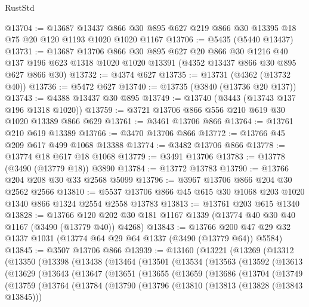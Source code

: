 \begin{lexlean}{RustStd}
\begin{coremodule}
{\begin{coremodule}
{{{{{{{{{{{{{{{{{{{{{{{{{{@13704 := @13687
    @13437
    @866
    @30
    @895
    @627
    @219
    @866
    @30
    @13395
    @18
    @75
    @20
    @120
    @1193
    @1020
    @1020
    @1167
@13706 := @5435 (@5440 @13437)
@13731 := @13687
    @13706
    @866
    @30
    @895
    @627
    @20
    @866
    @30
    @1216
    @40
    @137
    @196
    @623
    @1318
    @1020
    @1020
    @13391
    (@4352 @13437 @866 @30 @895 @627 @866 @30)
@13732 := @4374 @627
@13735 := @13731 (@4362 (@13732 @40))
@13736 := @5472 @627
@13740 := @13735 (@3840 (@13736 @20 @137))
@13743 := @4388 @13437 @30 @895
@13749 := @13740 (@3443 (@13743 @137 @196 @1318 @1020))
@13759 := @3721 @13706 @866 @556 @210 @619 @30 @1020 @13389 @866 @629
@13761 := @3461 @13706 @866
@13764 := @13761 @210 @619 @13389
@13766 := @3470 @13706 @866
@13772 := @13766 @45 @209 @617 @499 @1068 @13388
@13774 := @3482 @13706 @866
@13778 := @13774 @18 @617 @18 @1068
@13779 := @3491 @13706
@13783 := @13778 (@3490 (@13779 @18)) @3890
@13784 := @13772 @13783
@13790 := @13766 @204 @208 @30 @33 @2568 @5099
@13796 := @3967 @13706 @866 @204 @30 @2562 @2566
@13810 := @5537 @13706 @866 @45 @615 @30 @1068 @203 @1020 @1340 @866 @1324 @2554 @2558 @13783
@13813 := @13761 @203 @615 @1340
@13828 := @13766
    @120
    @202
    @30
    @181
    @1167
    @1339
    (@13774 @40 @30 @40 @1167 (@3490 (@13779 @40)) @4268)
@13843 := @13766 @200 @47 @29 @32 @1337 @1031 (@13774 @64 @29 @64 @1337 (@3490 (@13779 @64)) @5584)
@13845 := @3507 @13706 @866
@13939 := @13160
    (@13221
      (@13269
        (@13312
          (@13350
            (@13398
              (@13438
                (@13464
                  (@13501
                    (@13534
                      (@13563
                        (@13592
                          (@13613
                            (@13629
                              (@13643
                                (@13647
                                  (@13651
                                    (@13655
                                      (@13659
                                        (@13686
                                          (@13704
                                            (@13749
                                              (@13759
                                                (@13764
                                                  (@13784
                                                    (@13790
                                                      (@13796
                                                        (@13810
                                                          (@13813 (@13828 (@13843 @13845)))
}}}}}}}}}}}}}}}}}}}}}}}}}}
\end{coremodule}}
\end{coremodule}
\end{lexlean}
